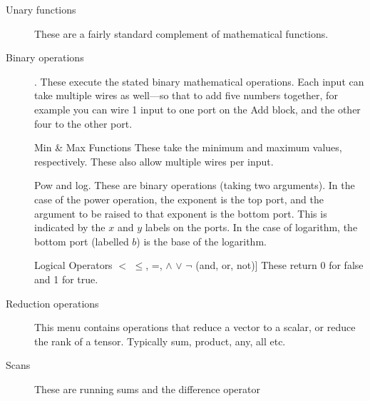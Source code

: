 \begin{description}
\begin{center}
\end{center}

\item[Unary functions] These are a fairly standard
complement of mathematical functions.

\item[Binary operations]
    . These execute the stated binary
    mathematical operations. Each input can take multiple wires as
    well---so that to add five numbers together, for example you can wire 1 input
    to one port on the Add block, and the other four to the other
    port. 

Min \& Max Functions These take the minimum and maximum values, respectively.
These also allow multiple wires per input.

Pow and log. These are binary operations (taking two
arguments). In the case of the power operation, the exponent is the
top port, and the argument to be raised to that exponent is the bottom
port. This is indicated by the $x$ and $y$ labels on the ports. In the
case of logarithm, the bottom port (labelled $b$) is the base of the
logarithm.

Logical Operators $<$ $\le$, =, $\wedge$ $\vee$ $\neg$ (and,
  or, not)] These return 0 for false and 1 for true.

\item[Reduction operations] This menu contains
  operations that reduce a vector to a scalar, or reduce the rank of a
  tensor. Typically sum, product, any, all etc.

\item[Scans] These are running sums and the
  difference operator


\end{description}
